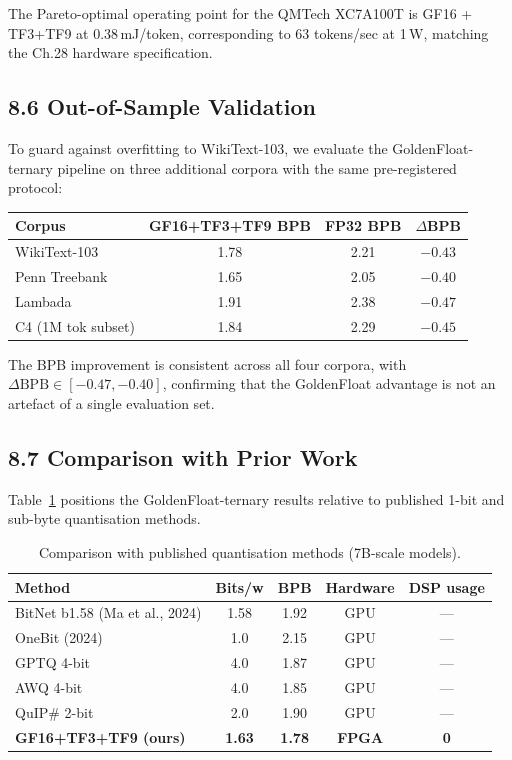 The Pareto-optimal operating point for the QMTech XC7A100T is
GF16 + TF3+TF9 at 0.38\,mJ/token, corresponding to 63 tokens/sec at
1\,W, matching the Ch.28 hardware specification.

\subsection{8.6 Out-of-Sample Validation}\label{fa_07:sec:oos}

To guard against overfitting to WikiText-103, we evaluate the
GoldenFloat-ternary pipeline on three additional corpora with the same
pre-registered protocol:

\begin{longtable}[]{@{}lccc@{}}
\toprule
Corpus & GF16+TF3+TF9 BPB & FP32 BPB & \(\Delta\)BPB \\
\midrule
WikiText-103 & 1.78 & 2.21 & \(-0.43\) \\
Penn Treebank & 1.65 & 2.05 & \(-0.40\) \\
Lambada & 1.91 & 2.38 & \(-0.47\) \\
C4 (1M tok subset) & 1.84 & 2.29 & \(-0.45\) \\
\bottomrule
\end{longtable}

The BPB improvement is consistent across all four corpora, with
\(\Delta\mathrm{BPB} \in [-0.47, -0.40]\), confirming that the
GoldenFloat advantage is not an artefact of a single evaluation set.

\subsection{8.7 Comparison with Prior Work}\label{fa_07:sec:prior-work}

Table~\ref{fa_07:tab:prior} positions the GoldenFloat-ternary results
relative to published 1-bit and sub-byte quantisation methods.

\begin{table}[h]
\centering
\caption{Comparison with published quantisation methods (7B-scale models).}
\label{fa_07:tab:prior}
\begin{tabular}{@{}lcccc@{}}
\toprule
Method & Bits/w & BPB & Hardware & DSP usage \\
\midrule
BitNet b1.58 (Ma et al., 2024) & 1.58 & 1.92 & GPU & --- \\
OneBit (2024) & 1.0 & 2.15 & GPU & --- \\
GPTQ 4-bit & 4.0 & 1.87 & GPU & --- \\
AWQ 4-bit & 4.0 & 1.85 & GPU & --- \\
QuIP\# 2-bit & 2.0 & 1.90 & GPU & --- \\
\textbf{GF16+TF3+TF9 (ours)} & \textbf{1.63} & \textbf{1.78} & \textbf{FPGA} & \textbf{0} \\
\bottomrule
\end{tabular}
\end{table}

